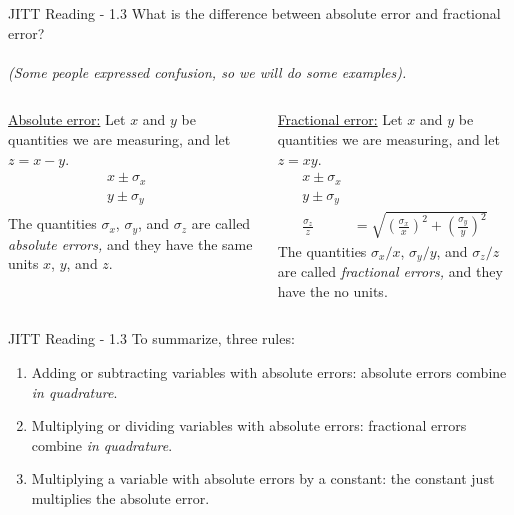 \documentclass{beamer}
\begin{document}
\begin{frame}{JITT Reading -  1.3}
\small
What is the difference between absolute error and fractional error? \\ \hrulefill \\
\textit{(Some people expressed confusion, so we will do some examples).} \\ \vspace{0.5cm}
\begin{columns}[T]
\begin{column}{0.5\textwidth}
\centering
\underline{Absolute error:} Let $x$ and $y$ be quantities we are measuring, and let $z=x-y$.
\begin{align}
x\pm\sigma_x & \\
y\pm\sigma_y & \\
\end{align}
The quantities $\sigma_x$, $\sigma_y$, and $\sigma_z$ are called \textit{absolute errors,} and they have the same units $x$, $y$, and $z$.
\end{column}
\vline \hspace{0.1cm}
\begin{column}{0.5\textwidth}
\centering
\underline{Fractional error:} Let $x$ and $y$ be quantities we are measuring, and let $z=xy$.
\begin{align}
x\pm\sigma_x & \\
y\pm\sigma_y & \\
\frac{\sigma_z}{z} &= \sqrt{\left(\frac{\sigma_x}{x}\right)^2 + \left(\frac{\sigma_y}{y}\right)^2} 
\end{align}
The quantities $\sigma_x/x$, $\sigma_y/y$, and $\sigma_z/z$ are called \textit{fractional errors,} and they have the no units.
\end{column}
\end{columns}
\end{frame}

\begin{frame}{JITT Reading -  1.3}
To summarize, three rules:
\begin{enumerate}
\item Adding or subtracting variables with absolute errors: absolute errors combine \textit{in quadrature}.
\item Multiplying or dividing variables with absolute errors: fractional errors combine \textit{in quadrature}.
\item Multiplying a variable with absolute errors by a constant: the constant just multiplies the absolute error.
\end{enumerate}
\end{frame}
\end{document}
